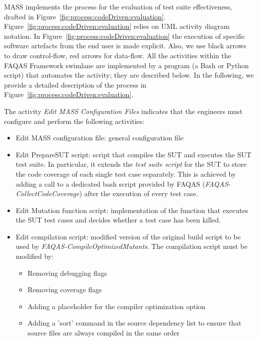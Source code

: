 MASS implements the process for the evaluation of test suite effectiveness, drafted in Figure~\ref{fig:process:codeDriven:evaluation}. Figure~\ref{fig:process:codeDriven:evaluation} relies on UML activity diagram notation. In Figure~\ref{fig:process:codeDriven:evaluation} the execution of specific software artefacts from the end user is made explicit. Also, we use black arrows to draw control-flow, red arrows for data-flow. All the activities within the FAQAS Framework swimlane are implemented by a program (a Bash or Python script) that automates the activity; they are described below. In the following, we provide a detailed description of the process in Figure~\ref{fig:process:codeDriven:evaluation}.


The activity \emph{Edit MASS Configuration Files} indicates that the engineers must configure and perform the following activities:
\begin{itemize}
	\item Edit MASS configuration file: general configuration file
	\item Edit PrepareSUT script: script that compiles the SUT and executes the SUT test suite. In particular,  it extends the \emph{test suite script} for the SUT to store the code coverage of each single test case separately. This is achieved by adding a call to a dedicated bash script provided by FAQAS (\emph{FAQAS-CollectCodeCoverage}) after the execution of every test case.
	\item Edit Mutation function script: implementation of the function that executes the SUT test cases and decides whether a test case has been killed.
	\item Edit compilation script: modified version of the original build script to be used by \emph{FAQAS-}\emph{Compile\-OptimizedMutants}. The compilation script must be modified by:
	\begin{itemize}
	\item Removing debugging flags
	\item Removing coverage flags
	\item Adding a placeholder for the compiler optimization option
	\item Adding a 'sort' command in the source dependency list to ensure that source files are always compiled in the same order
	\end{itemize}
\end{itemize}


